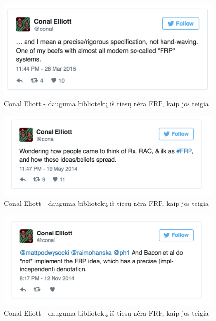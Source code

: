 \documentclass{VUMIFPSmagistrinis}
\begin{document}
\begin{figure}[H]
    \centering
    \includegraphics[scale=0.5]{img/not_frp2}
    \caption{Conal Eliott - dauguma bibliotekų iš tiesų nėra FRP, kaip jos teigia}
    \label{img:not_frp2}
\end{figure}

\begin{figure}[H]
    \centering
    \includegraphics[scale=0.5]{img/not_frp3}
    \caption{Conal Eliott - dauguma bibliotekų iš tiesų nėra FRP, kaip jos teigia}
    \label{img:not_frp3}
\end{figure}

\begin{figure}[H]
    \centering
    \includegraphics[scale=0.5]{img/not_frp4}
    \caption{Conal Eliott - dauguma bibliotekų iš tiesų nėra FRP, kaip jos teigia}
    \label{img:not_frp4}
\end{figure}
\end{document}
